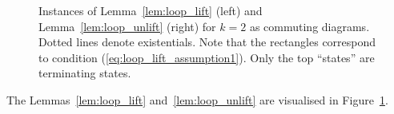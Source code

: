 \begin{figure}
  \center
  \hspace{1cm}
  \caption{Instances of Lemma~\ref{lem:loop_lift} (left) and Lemma~\ref{lem:loop_unlift} (right) for $k=2$ as commuting diagrams.  Dotted lines denote
    existentials.  Note that the rectangles correspond to condition (\ref{eq:loop_lift_assumption1}).  Only the top ``states'' are terminating
    states.}
  \label{fig:loop_lift_lemmas}
\end{figure}

The Lemmas~\ref{lem:loop_lift} and~\ref{lem:loop_unlift} are visualised in Figure~\ref{fig:loop_lift_lemmas}.

